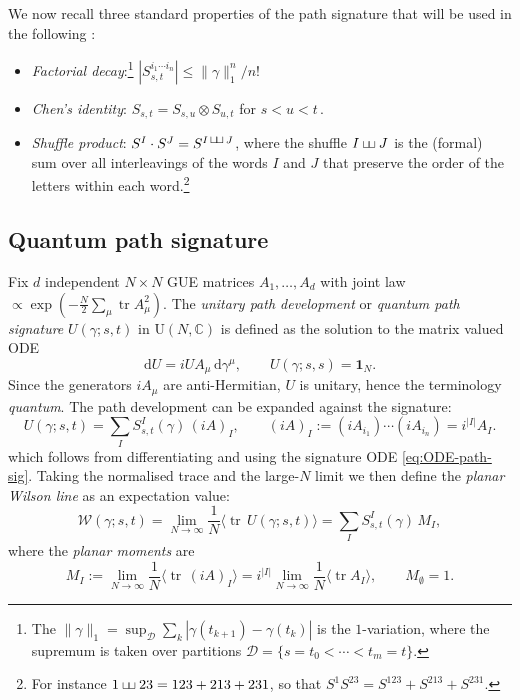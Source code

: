 \documentclass[11pt,a4paper]{article}
\DeclareMathOperator{\tr}{tr}
\newcommand{\cW}{\mathcal{W}}
\newcommand{\dd}{\mathrm{d}}
\newcommand{\shuffle}{\mathbin{\text{\footnotesize$\sqcup\!\sqcup$}}}
\begin{document}
We now recall three standard properties of the path signature that will be used in the following \cite{lyons2007differential,reutenauer2003free}:

\begin{itemize}
    \item \emph{Factorial decay}:\footnote{The $\|\gamma\|_1=\sup_{\mathcal{D}}\sum_k|\gamma(t_{k+1})-\gamma(t_k)|$ is the $1$-variation, where the supremum is taken over partitions $\mathcal{D}=\{s=t_0<\cdots<t_m=t\}$.} $|S^{i_1\cdots i_n}_{s,t}|\leq\|\gamma\|_1^n/n!$ 
    \item \emph{Chen's identity}: $S_{s,t} = S_{s,u}\otimes S_{u,t}$ for $s<u<t$\,.
    \item \emph{Shuffle product}: $S^I\cdot S^J = S^{I\, \shuffle\, J}$, where the shuffle $I\shuffle J$ is the (formal) sum over all
    interleavings of the words $I$ and $J$ that preserve the order of the letters within each word.\footnote{For instance $1\shuffle 23 = 123+213+231$, so that $S^1 S^{23} = S^{123}+S^{213}+S^{231}$.}
\end{itemize}




\subsection{Quantum path signature}

Fix $d$ independent $N\times N$ GUE matrices $A_1,\ldots,A_d$ with joint law $\propto\exp(-\frac{N}{2}\sum_\mu\tr A_\mu^2)$.  The \emph{unitary path development} \cite{lou2023pcf,chevyrev2016characteristic}  or \emph{quantum path signature} \cite{crew2025quantum} $U(\gamma;s,t)$ in $\mathrm{U}(N,\mathbb{C})$ is defined as the solution to the matrix valued ODE
\begin{equation}\label{eq:dev}
  \dd U = i U A_\mu\,\dd\gamma^\mu,
  \qquad U(\gamma;s,s)=\mathbf{1}_N.
\end{equation}
Since the generators $iA_\mu$ are anti-Hermitian, $U$ is unitary, hence the terminology \emph{quantum}. The path development can be expanded against the signature:
\begin{equation}\label{eq:U-expand}
    U(\gamma;s,t) = \sum_{I} S^{I}_{s,t}(\gamma)\,(iA)_I, \qquad (iA)_I := (iA_{i_1})\cdots(iA_{i_n}) = i^{|I|}A_I.
\end{equation}
which follows from differentiating and using the signature ODE \eqref{eq:ODE-path-sig}. Taking the normalised trace and the large-$N$ limit we then define the \emph{planar Wilson line} as an expectation value:
\begin{equation}\label{eq:wilson}
  \cW(\gamma;s,t) 
  = \lim_{N\to\infty}\frac{1}{N}
  \bigl\langle\tr\,U(\gamma;s,t)\bigr\rangle
  = \sum_{I}S^{I}_{s,t}(\gamma)\,M_{I},
\end{equation}
where the \emph{planar moments} are \begin{equation}\label{eq:planar-moments}
 M_I := \lim_{N\to\infty}\frac{1}{N}\bigl\langle\tr\,(iA)_I\bigr\rangle  = i^{|I|}\lim_{N\to\infty}\frac{1}{N}\bigl\langle\tr A_I\bigr\rangle,
  \qquad M_\emptyset = 1.
\end{equation}
\end{document}
